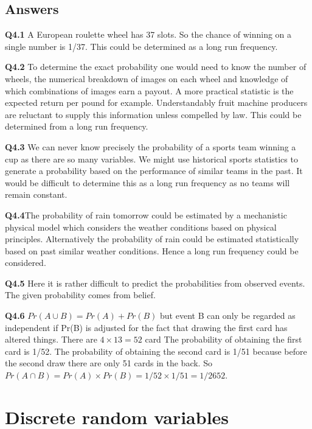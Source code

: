 \documentclass[
  oneside]{krantz}
\begin{document}
\hypertarget{ANSprob}{%
\section{Answers}\label{ANSprob}}

\textbf{Q4.1} A European roulette wheel has 37 slots. So the chance of winning on a single number is 1/37. This could be determined as a long run frequency.

\textbf{Q4.2} To determine the exact probability one would need to know the number of wheels, the numerical breakdown of images on each wheel and knowledge of which combinations of images earn a payout. A more practical statistic is the expected return per pound for example. Understandably fruit machine producers are reluctant to supply this information unless compelled by law. This could be determined from a long run frequency.

\textbf{Q4.3} We can never know precisely the probability of a sports team winning a cup as there are so many variables. We might use historical sports statistics to generate a probability based on the performance of similar teams in the past. It would be difficult to determine this as a long run frequency as no teams will remain constant.

\textbf{Q4.4}The probability of rain tomorrow could be estimated by a mechanistic physical model which considers the weather conditions based on physical principles. Alternatively the probability of rain could be estimated statistically based on past similar weather conditions. Hence a long run frequency could be considered.

\textbf{Q4.5} Here it is rather difficult to predict the probabilities from observed events. The given probability comes from belief.

\textbf{Q4.6} \(Pr(A \cup B) = Pr(A) + Pr(B)\) but event B can only be regarded as independent if Pr(B) is adjusted for the fact that drawing the first card has altered things. There are \(4 \times 13 =52\) card
The probability of obtaining the first card is 1/52. The probability of obtaining the second card is 1/51 because before the second draw there are only 51 cards in the back.
So \(Pr(A \cap B) = Pr(A) \times Pr(B) = 1/52 \times 1/51 = 1/2652\).

\hypertarget{discreterv}{%
\chapter{Discrete random variables}\label{discreterv}}
\end{document}
